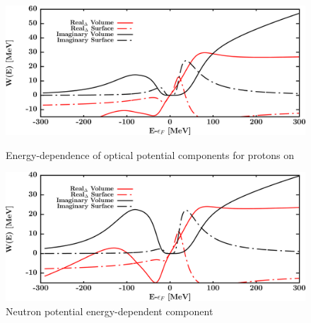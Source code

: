 \begin{figure}[H]
    \centering
    \begin{minipage}{0.45\textwidth}
        \centering
        \includegraphics[width=1.0\textwidth]{figures/sn112_protonPotentials.png}
        \caption{Energy-dependence of optical potential components for protons
        on \snTwelve}
        \label{DOMFitData_sn112_proton_potentialComponent_energy}
    \end{minipage}\hfill
    \begin{minipage}{0.45\textwidth}
        \centering
        \includegraphics[width=1.0\textwidth]{figures/sn112_neutronPotentials.png}
        \caption{Neutron potential energy-dependent component}
        \label{DOMFitData_sn112_neutron_potentialComponent_energy}
    \end{minipage}
\end{figure}

